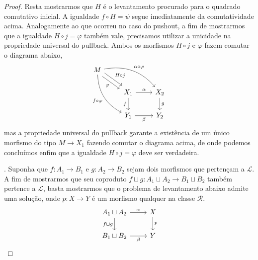 \begin{proof}
  Resta mostrarmos que $H$ é o levantamento procurado para o quadrado comutativo inicial.
  A igualdade $f \circ H = \psi$ segue imediatamente da comutatividade acima.
  Analogamente ao que ocorreu no caso do pushout, a fim de mostrarmos que a igualdade $H \circ j = \varphi$ também vale, precisamos utilizar a unicidade na propriedade universal do pullback.
  Ambos os morfismos $H \circ j$ e $\varphi$ fazem comutar o diagrama abaixo,
  \begin{displaymath}
    \begin{tikzcd}
      M
      \arrow[rd, shift left=1.2, "H \circ j"]
      \arrow[rd, shift right=1.2, "\varphi" swap]
      \arrow[rrd, bend left=30, "\alpha \circ \varphi"]
      \arrow[rdd, bend right=30, "f \circ \varphi" swap]
      \\ & X_{1}
      \arrow[r, "\alpha"]
      \arrow[d, "f" swap]
      & X_{2}
      \arrow[d, "g"]
      \\ & Y_{1}
      \arrow[r, "\beta" swap]
      & Y_{2}
    \end{tikzcd}
  \end{displaymath}
  mas a propriedade universal do pullback garante a existência de um único morfismo do tipo $M \to X_{1}$ fazendo comutar o diagrama acima, de onde podemos concluímos enfim que a igualdade $H \circ j = \varphi$ deve ser verdadeira.

  . Suponha que $f: A_{1} \to B_{1}$ e $g: A_{2} \to B_{2}$ sejam dois morfismos que pertençam a $\mathcal{L}$.
  A fim de mostrarmos que seu coproduto $f \sqcup g: A_{1} \sqcup A_{2} \to B_{1} \sqcup B_{2}$ também pertence a $\mathcal{L}$, basta mostrarmos que o problema de levantamento abaixo admite uma solução, onde $p: X \to Y$ é um morfismo qualquer na classe $\mathcal{R}$.
  \begin{displaymath}
    \begin{tikzcd}
      A_{1} \sqcup A_{2}
      \arrow[r, "\alpha"]
      \arrow[d, "f \sqcup g" swap]
      & X
      \arrow[d, "p"]
      \\ B_{1} \sqcup B_{2}
      \arrow[r, "\beta" swap]
      & Y
    \end{tikzcd}
  \end{displaymath}


\end{proof}
